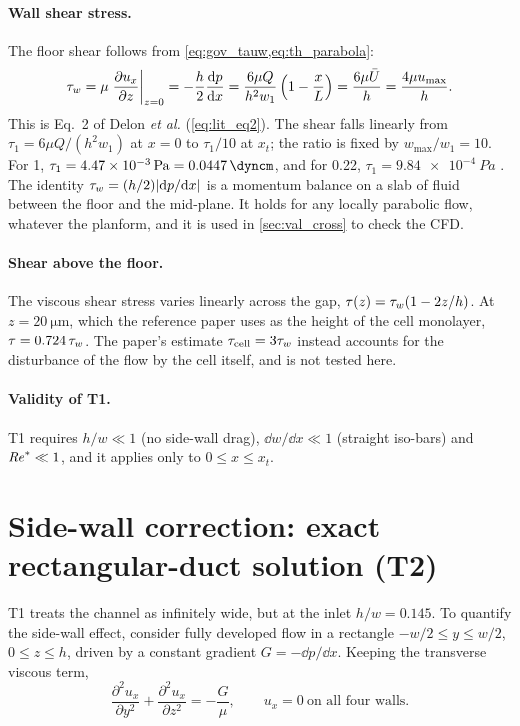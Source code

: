 \paragraph{Wall shear stress.} The floor shear follows from \cref{eq:gov_tauw,eq:th_parabola}:
\begin{equation}
\tau_{w}=\mu\left.\frac{\partial u_x}{\partial z}\right|_{z=0}=-\frac{h}{2}\frac{\mathrm{d} p}{\mathrm{d} x}
=\frac{6\mu Q}{h^2w_1}\left(1-\frac{x}{L}\right)
=\frac{6\mu\bar U}{h}=\frac{4\mu u_{\max}}{h}.
\label{eq:th_tauw}
\end{equation}
This is Eq.~2 of Delon \emph{et al.} (\cref{eq:lit_eq2}). The shear falls linearly from $\tau_1=6\mu Q/(h^2w_1)$ at $x=0$ to $\tau_1/10$ at $x_t$; the ratio is fixed by $w_{\max}/w_1=10$. For \SI{1}{\uLmin}, $\tau_1=\SI{4.47e-3}{Pa}=\SI{0.0447}{\dyncm}$, and for \SI{0.22}{\uLmin}, $\tau_1=\SI{9.84e-4}{Pa}$ \tagT. The identity $\tau_{w}=(h/2)|\mathrm{d} p/\mathrm{d} x|$ is a momentum balance on a slab of fluid between the floor and the mid-plane. It holds for any locally parabolic flow, whatever the planform, and it is used in \cref{sec:val_cross} to check the CFD.

\paragraph{Shear above the floor.} The viscous shear stress varies linearly across the gap, $\tau(z)=\tau_{w}(1-2z/h)$. At $z=\SI{20}{\micro\metre}$, which the reference paper uses as the height of the cell monolayer, $\tau=0.724\,\tau_{w}$. The paper's estimate $\tau_{\mathrm{cell}}=3\tau_{w}$ \citep{GaverKute1998} instead accounts for the disturbance of the flow by the cell itself, and is not tested here.

\paragraph{Validity of T1.} T1 requires $h/w\ll1$ (no side-wall drag), $\dd w/\dd x\ll1$ (straight iso-bars) and $\mathit{Re}^*\ll1$, and it applies only to $0\le x\le x_t$.

\section{Side-wall correction: exact rectangular-duct solution (T2)}
\label{sec:th_sidewall}

T1 treats the channel as infinitely wide, but at the inlet $h/w=0.145$. To quantify the side-wall effect, consider fully developed flow in a rectangle $-w/2\le y\le w/2$, $0\le z\le h$, driven by a constant gradient $G=-\dd p/\dd x$. Keeping the transverse viscous term,
\begin{equation}
\frac{\partial^2u_x}{\partial y^2}+\frac{\partial^2u_x}{\partial z^2}=-\frac{G}{\mu},
\qquad u_x=0\ \text{on all four walls.}
\label{eq:th_poisson}
\end{equation}
